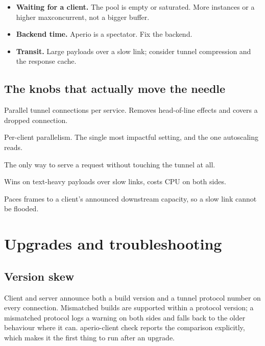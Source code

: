 \documentclass[11pt,a4paper,oneside]{book}
\newcommand{\aperiobreakableunderscore}{\textunderscore\allowbreak}
\newcommand{\aperiocodebreaks}{\XeTeXinterchartokenstate=1 }
\newcommand{\aperiocodebreaks}{}
\DeclareRobustCommand{\code}[1]{{\ttfamily\small\aperiocodebreaks
  \let\_\aperiobreakableunderscore#1}}
\begin{document}
\begin{itemize}[leftmargin=1.3em]
  \item \textbf{Waiting for a client.} The pool is empty or saturated.
        More instances or a higher \code{max\_concurrent}, not a bigger
        buffer.
  \item \textbf{Backend time.} Aperio is a spectator. Fix the backend.
  \item \textbf{Transit.} Large payloads over a slow link; consider tunnel
        compression and the response cache.
\end{itemize}

\section{The knobs that actually move the needle}

\begin{description}[leftmargin=1.6em,style=nextline]
  \item[\code{connections}] Parallel tunnel connections per service.
        Removes head-of-line effects and covers a dropped connection.
  \item[\code{max\_concurrent}] Per-client parallelism. The single most
        impactful setting, and the one autoscaling reads.
  \item[Response cache] The only way to serve a request without touching
        the tunnel at all.
  \item[Tunnel compression] Wins on text-heavy payloads over slow links,
        costs CPU on both sides.
  \item[\code{bandwidth}] Paces frames to a client's announced downstream
        capacity, so a slow link cannot be flooded.
\end{description}

\chapter{Upgrades and troubleshooting}
\label{ch:troubleshooting}

\section{Version skew}

Client and server announce both a build version and a tunnel protocol
number on every connection. Mismatched builds are supported within a
protocol version; a mismatched protocol logs a warning on both sides and
falls back to the older behaviour where it can. \code{aperio-client
check} reports the comparison explicitly, which makes it the first thing
to run after an upgrade.
\end{document}
